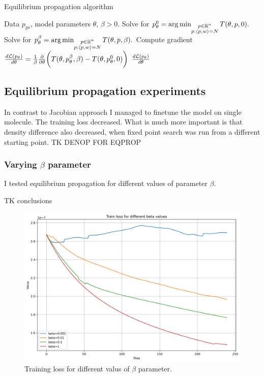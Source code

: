 \documentclass[a4paper,10pt]{report}
\begin{document}
\begin{algorithm}[H]
\caption{Equilibrium propagation algorithm}
\begin{algorithmic}[1]
\Require Data $p_{gs}$, model parameters $\theta$, $\beta>0$.
\State  Solve for $p_\theta^0  = \operatorname*{arg\,min}_{\substack{p \in \mathbb{R}^n \\ p: \langle p, w \rangle=N }} T(\theta, p, 0).$
\State Solve for $p_\theta^\beta  = \operatorname*{arg\,min}_{\substack{p \in \mathbb{R}^n \\ p: \langle p, w \rangle=N }} T(\theta, p, \beta).$
\State Compute gradient $\frac{d\mathcal{L}(p_\theta)}{d \theta} = \frac{1}{\beta} \frac{\partial }{\partial \theta} \bigg(T(\theta, p_\theta^\beta,\beta) - T(\theta, p_\theta^0, 0)\bigg)$
\State \Return $\frac{d\mathcal{L}(p_\theta)}{d \theta}$
\end{algorithmic}
\end{algorithm}


\subsection{Equilibrium propagation experiments}
In contrast to Jacobian approach I managed to finetune the model on single molecule.
The training loss decreased. What is much more important is that density difference also decreased, when fixed point search was run from a different starting point.
TK DENOP FOR EQPROP
\subsubsection{Varying $\beta$ parameter}
I tested equilibrium propagation for different values of parameter $\beta$.

TK conclusions
\begin{figure}[H]
 \centering
 \includegraphics[scale=0.5]{images/train_loss_betas.png}
 \caption{Training loss for different valus of $\beta$ parameter.}
 \label{fig:betas}
\end{figure}
\end{document}
